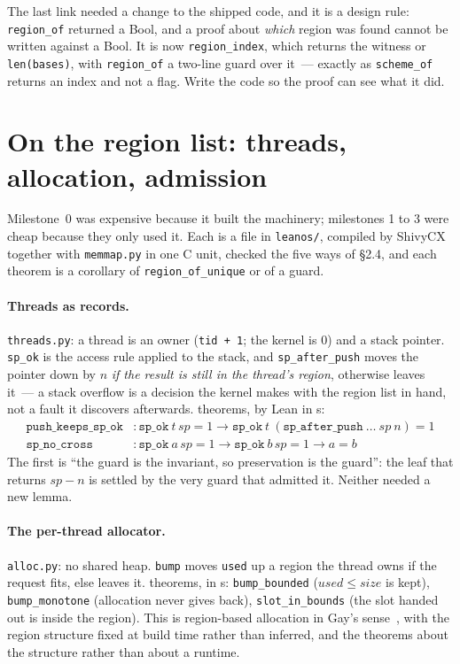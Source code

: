 \documentclass[11pt]{article}
\begin{document}
The last link needed a change to the shipped code, and it is a design
rule: \texttt{region\_of} returned a Bool, and a proof about \emph{which}
region was found cannot be written against a Bool.  It is now
\texttt{region\_index}, which returns the witness or \texttt{len(bases)},
with \texttt{region\_of} a two-line guard over it~--- exactly as
\texttt{scheme\_of} returns an index and not a flag.  Write the code so the
proof can see what it did.

\section{On the region list: threads, allocation, admission}

Milestone~0 was expensive because it built the machinery; milestones 1 to 3
were cheap because they only used it.  Each is a file in \texttt{leanos/},
compiled by ShivyCX together with \texttt{memmap.py} in one C unit, checked
the five ways of \S2.4, and each theorem is a corollary of
\texttt{region\_of\_unique} or of a guard.

\paragraph{Threads as records.}  \texttt{threads.py}: a thread is an owner
(\texttt{tid + 1}; the kernel is 0) and a stack pointer.  \texttt{sp\_ok} is
the access rule applied to the stack, and \texttt{sp\_after\_push} moves the
pointer down by $n$ \emph{if the result is still in the thread's region},
otherwise leaves it~--- a stack overflow is a decision the kernel makes with
the region list in hand, not a fault it discovers afterwards.  \thrTheorems{}
theorems, \thrLeanVerdict{} by Lean in \thrLeanSeconds{}s:
\begin{align*}
\texttt{push\_keeps\_sp\_ok} &: \texttt{sp\_ok}\ t\,\mathit{sp} = 1 \to \texttt{sp\_ok}\ t\ (\texttt{sp\_after\_push}\ \ldots\ \mathit{sp}\ n) = 1\\
\texttt{sp\_no\_cross} &: \texttt{sp\_ok}\ a\,\mathit{sp} = 1 \to \texttt{sp\_ok}\ b\,\mathit{sp} = 1 \to a = b
\end{align*}
The first is ``the guard is the invariant, so preservation is the guard'':
the leaf that returns $\mathit{sp}-n$ is settled by the very guard that
admitted it.  Neither needed a new lemma.

\paragraph{The per-thread allocator.}  \texttt{alloc.py}: no shared heap.
\texttt{bump} moves \texttt{used} up a region the thread owns if the request
fits, else leaves it.  \alcTheorems{} theorems, \alcLeanVerdict{} in
\alcLeanSeconds{}s: \texttt{bump\_bounded} ($\mathit{used}\le\mathit{size}$
is kept), \texttt{bump\_monotone} (allocation never gives back),
\texttt{slot\_in\_bounds} (the slot handed out is inside the region).  This
is region-based allocation in Gay's sense~\cite{gay2001}, with the region
structure fixed at build time rather than inferred, and the theorems about
the structure rather than about a runtime.
\end{document}
